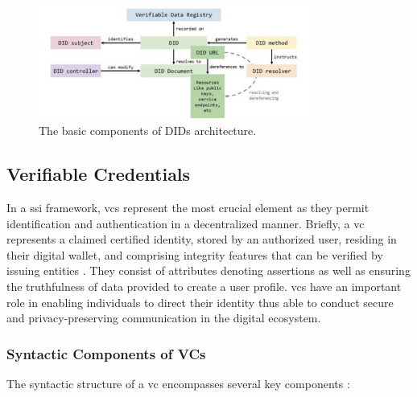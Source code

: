 \begin{figure}[h]  
  \centering
  \includegraphics[width=0.8\textwidth]{Images/c4_2.png} 
  \caption{The basic components of DIDs architecture.}
\end{figure}

\subsection{Verifiable Credentials}

In a \gls{ssi} framework, \gls{vc}s represent the most crucial element as they permit identification and authentication in a 
decentralized manner. Briefly, a \gls{vc} represents a claimed certified identity, stored by an authorized user, residing in their digital wallet, and comprising integrity 
features that can be verified by issuing entities \cite{9333857}. They consist of attributes denoting assertions as well as ensuring the truthfulness of data provided to create a user 
profile. \gls{vc}s have an important role in enabling individuals to direct their identity thus able to conduct secure and privacy-preserving communication in the digital ecosystem.

\subsubsection{Syntactic Components of VCs}

The syntactic structure of a \gls{vc} encompasses several key components \cite{w3cvcdatamodel}:

